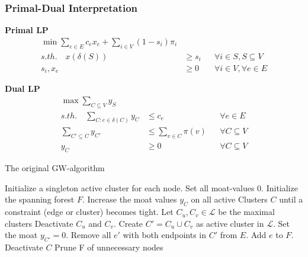 \documentclass[11pt]{beamer}
\begin{document}
\begin{frame}
	\frametitle{Primal-Dual Interpretation}
	\textbf{Primal LP}
	\begin{align*}
		\min \sum_{e \in E} c_e x_e + \sum_{i \in V} (1-s_i) \pi_i& \\
		 s.th. \quad x(\delta(S)) &\ge s_i && \forall i \in S, S \subseteq V \\
		s_i, x_e&\ge 0 && \forall i \in V, \forall e \in E
	\end{align*}
	
	\textbf{Dual LP}
	\begin{align*}
		\max \sum_{C  \subseteq V} y_S & \\
		s.th. \quad \sum_{C: e \in \delta(C)} y_C &\le c_e && \forall e \in E \\
		\sum_{C'  \subseteq C}y_{C'} &\le \sum_{v \in C} \pi(v) && \forall C  \subseteq V \\
		y_C &\ge 0 && \forall C \subseteq V
	\end{align*}
\end{frame}

\begin{frame}[shrink=10, plain]
	\begin{algorithm}[H]
		\caption{ The original GW-algorithm }\label{euclid}
		\begin{algorithmic}[1]
			\State Initialize a singleton active cluster for each node. Set all moat-values 0.
			\State Initialize the spanning forest $F$.
			\State Increase the moat values $y_C$ on all active Clusters $C$ until  a constraint (edge or cluster) becomes tight.
			\State Let $C_u, C_v \in \mathcal{L}$ be the maximal clusters
			\State Deactivate $C_u$ and $C_v$.
			\State Create $C' = C_u \cup C_v$ as active cluster in $\mathcal{L}$.
			\State Set the moat $y_{C'} = 0$.
			\State Remove all $e'$ with both endpoints in $C'$ from $E$.
			\State Add $e$ to $F$.
			\EndIf
			\State Deactivate $C$
			\EndIf
			\EndWhile
			\State Prune F of unnecessary nodes 
			\EndFunction
		\end{algorithmic}
	\end{algorithm}
\end{frame}
\end{document}
